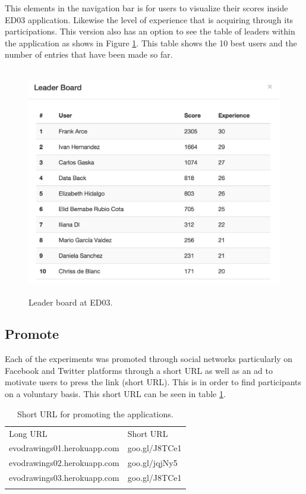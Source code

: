 This elements in the navigation bar is for users to visualize their scores
inside ED03 application. Likewise the level of experience that is acquiring
through its participations. This version also has an option to see the table of
leaders within the application as shows in Figure \ref{fig:leaderBoard}. This
table shows the 10 best users and the number of entries that have been made so
far.


\begin{figure}
\captionsetup{justification=centering,margin=2cm}
\centering
\setlength\fboxsep{0pt}
\setlength\fboxrule{0.7pt}
\includegraphics[width=12cm,height=10cm,keepaspectratio]{img/leaderBoard.png}
\caption{Leader board at ED03.}
\label{fig:leaderBoard}
\end{figure}


\subsection{Promote}

Each of the experiments was promoted through social networks particularly on
Facebook and Twitter platforms through a short URL as well as an ad to motivate
users to press the link (short URL). This is in order to find participants on a
voluntary basis. This short URL can be seen in table \ref{tab:PromoteUrl}.

\begin{table}
\small
\caption{Short URL for promoting the applications.}
\label{tab:PromoteUrl}
\centering
\small
\begin{tabular}{p{5cm} p{4cm}  }
\hline\noalign{\smallskip}
 Long URL & Short URL \\
\noalign{\smallskip}\hline\noalign{\smallskip}
\small{evodrawings01.herokuapp.com } & \small{goo.gl/J8TCe1}  \\ \hline
\small{evodrawings02.herokuapp.com } & \small{goo.gl/jqjNy5}  \\ \hline
\small{evodrawings03.herokuapp.com} & \small{goo.gl/J8TCe1}  \\ \hline
\noalign{\smallskip}\hline
\end{tabular}
\end{table}


